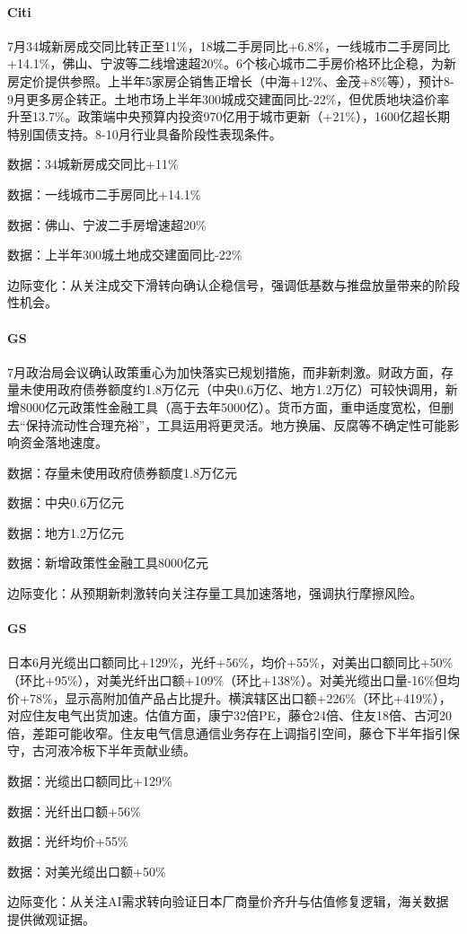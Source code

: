\documentclass[11pt]{ctexart}
\begin{document}
\paragraph{Citi} 7月34城新房成交同比转正至11\%，18城二手房同比+6.8\%，一线城市二手房同比+14.1\%，佛山、宁波等二线增速超20\%。6个核心城市二手房价格环比企稳，为新房定价提供参照。上半年5家房企销售正增长（中海+12\%、金茂+8\%等），预计8-9月更多房企转正。土地市场上半年300城成交建面同比-22\%，但优质地块溢价率升至13.7\%。政策端中央预算内投资970亿用于城市更新（+21\%），1600亿超长期特别国债支持。8-10月行业具备阶段性表现条件。
{\small\color{refgray}数据：34城新房成交同比+11\%\par}
{\small\color{refgray}数据：一线城市二手房同比+14.1\%\par}
{\small\color{refgray}数据：佛山、宁波二手房增速超20\%\par}
{\small\color{refgray}数据：上半年300城土地成交建面同比-22\%\par}
{\small\color{refgray}边际变化：从关注成交下滑转向确认企稳信号，强调低基数与推盘放量带来的阶段性机会。\par}
\paragraph{GS} 7月政治局会议确认政策重心为加快落实已规划措施，而非新刺激。财政方面，存量未使用政府债券额度约1.8万亿元（中央0.6万亿、地方1.2万亿）可较快调用，新增8000亿元政策性金融工具（高于去年5000亿）。货币方面，重申适度宽松，但删去“保持流动性合理充裕”，工具运用将更灵活。地方换届、反腐等不确定性可能影响资金落地速度。
{\small\color{refgray}数据：存量未使用政府债券额度1.8万亿元\par}
{\small\color{refgray}数据：中央0.6万亿元\par}
{\small\color{refgray}数据：地方1.2万亿元\par}
{\small\color{refgray}数据：新增政策性金融工具8000亿元\par}
{\small\color{refgray}边际变化：从预期新刺激转向关注存量工具加速落地，强调执行摩擦风险。\par}
\paragraph{GS} 日本6月光缆出口额同比+129\%，光纤+56\%，均价+55\%，对美出口额同比+50\%（环比+95\%），对美光纤出口额+109\%（环比+138\%）。对美光缆出口量-16\%但均价+78\%，显示高附加值产品占比提升。横滨辖区出口额+226\%（环比+419\%），对应住友电气出货加速。估值方面，康宁32倍PE，藤仓24倍、住友18倍、古河20倍，差距可能收窄。住友电气信息通信业务存在上调指引空间，藤仓下半年指引保守，古河液冷板下半年贡献业绩。
{\small\color{refgray}数据：光缆出口额同比+129\%\par}
{\small\color{refgray}数据：光纤出口额+56\%\par}
{\small\color{refgray}数据：光纤均价+55\%\par}
{\small\color{refgray}数据：对美光缆出口额+50\%\par}
{\small\color{refgray}边际变化：从关注AI需求转向验证日本厂商量价齐升与估值修复逻辑，海关数据提供微观证据。\par}
\end{document}
